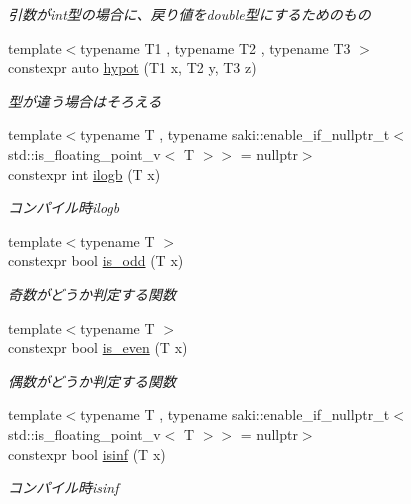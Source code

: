 \begin{DoxyCompactItemize}
\begin{DoxyCompactList}\small\item\em 引数がint型の場合に、戻り値をdouble型にするためのもの \end{DoxyCompactList}\item 
{\footnotesize template$<$typename T1 , typename T2 , typename T3 $>$ }\\constexpr auto \mbox{\hyperlink{namespacesaki_ada6f15bbf909992e4840325c0dae0c42}{hypot}} (T1 x, T2 y, T3 z)
\begin{DoxyCompactList}\small\item\em 型が違う場合はそろえる \end{DoxyCompactList}\item 
{\footnotesize template$<$typename T , typename saki\+::enable\+\_\+if\+\_\+nullptr\+\_\+t$<$ std\+::is\+\_\+floating\+\_\+point\+\_\+v$<$ T $>$$>$  = nullptr$>$ }\\constexpr int \mbox{\hyperlink{namespacesaki_a582e9de82aa8572287c01530ae2626a8}{ilogb}} (T x)
\begin{DoxyCompactList}\small\item\em コンパイル時ilogb \end{DoxyCompactList}\item 
{\footnotesize template$<$typename T $>$ }\\constexpr bool \mbox{\hyperlink{namespacesaki_a03cf21b9e2231e956f8da966f1e09d70}{is\+\_\+odd}} (T x)
\begin{DoxyCompactList}\small\item\em 奇数がどうか判定する関数 \end{DoxyCompactList}\item 
{\footnotesize template$<$typename T $>$ }\\constexpr bool \mbox{\hyperlink{namespacesaki_a7fa7e4ec89e948874e42926e91d6dd4e}{is\+\_\+even}} (T x)
\begin{DoxyCompactList}\small\item\em 偶数がどうか判定する関数 \end{DoxyCompactList}\item 
{\footnotesize template$<$typename T , typename saki\+::enable\+\_\+if\+\_\+nullptr\+\_\+t$<$ std\+::is\+\_\+floating\+\_\+point\+\_\+v$<$ T $>$$>$  = nullptr$>$ }\\constexpr bool \mbox{\hyperlink{namespacesaki_a2168418bb30a857d2d018d0d05c7ace0}{isinf}} (T x)
\begin{DoxyCompactList}\small\item\em コンパイル時isinf \end{DoxyCompactList}\item 

\end{DoxyCompactItemize}
